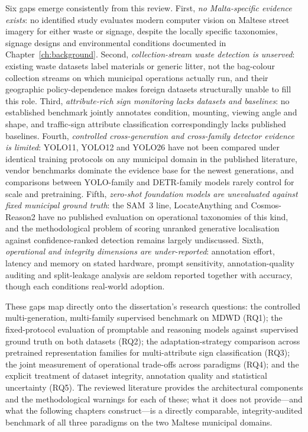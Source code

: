 Six gaps emerge consistently from this review. First, \emph{no Malta-specific evidence exists}: no identified study evaluates modern computer vision on Maltese street imagery for either waste or signage, despite the locally specific taxonomies, signage designs and environmental conditions documented in Chapter~\ref{ch:background}. Second, \emph{collection-stream waste detection is unserved}: existing waste datasets label materials or generic litter, not the bag-colour collection streams on which municipal operations actually run, and their geographic policy-dependence makes foreign datasets structurally unable to fill this role. Third, \emph{attribute-rich sign monitoring lacks datasets and baselines}: no established benchmark jointly annotates condition, mounting, viewing angle and shape, and traffic-sign attribute classification correspondingly lacks published baselines. Fourth, \emph{controlled cross-generation and cross-family detector evidence is limited}: YOLO11, YOLO12 and YOLO26 have not been compared under identical training protocols on any municipal domain in the published literature, vendor benchmarks dominate the evidence base for the newest generations, and comparisons between YOLO-family and DETR-family models rarely control for scale and pretraining. Fifth, \emph{zero-shot foundation models are unevaluated against fixed municipal ground truth}: the SAM~3 line, LocateAnything and Cosmos-Reason2 have no published evaluation on operational taxonomies of this kind, and the methodological problem of scoring unranked generative localisation against confidence-ranked detection remains largely undiscussed. Sixth, \emph{operational and integrity dimensions are under-reported}: annotation effort, latency and memory on stated hardware, prompt sensitivity, annotation-quality auditing and split-leakage analysis are seldom reported together with accuracy, though each conditions real-world adoption.

These gaps map directly onto the dissertation's research questions: the controlled multi-generation, multi-family supervised benchmark on MDWD (RQ1); the fixed-protocol evaluation of promptable and reasoning models against supervised ground truth on both datasets (RQ2); the adaptation-strategy comparison across pretrained representation families for multi-attribute sign classification (RQ3); the joint measurement of operational trade-offs across paradigms (RQ4); and the explicit treatment of dataset integrity, annotation quality and statistical uncertainty (RQ5). The reviewed literature provides the architectural components and the methodological warnings for each of these; what it does not provide---and what the following chapters construct---is a directly comparable, integrity-audited benchmark of all three paradigms on the two Maltese municipal domains.
